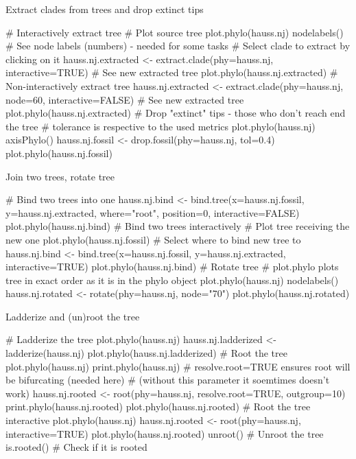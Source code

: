 \documentclass[compress, ucs, xelatex, 11pt, xcolor=svgnames,
  hyperref={
    bookmarks=true,
    unicode=true,
    colorlinks=true,
    pdftitle={Molecular data in R},
    plainpages=false,
    pdfauthor={Vojtech Zeisek},
    pdfsubject={Course about phylogeny and evolution in R},
    pdfcreator={XeLaTeX},
    pdfkeywords={R, evolution, phylogeny, molecular data},
    linkcolor=Tomato,
    anchorcolor=SaddleBrown,
    citecolor=Goldenrod,
    filecolor=DarkMagenta,
    menucolor=Sienna,
    urlcolor=DarkTurquoise,
    pdftex},
  url={hyphens, lowtilde} %
  ]{beamer}
\begin{document}
\begin{frame}[fragile]{Extract clades from trees and drop extinct tips}
  \begin{spluscode}
    # Interactively extract tree
    # Plot source tree
    plot.phylo(hauss.nj)
    nodelabels() # See node labels (numbers) - needed for some tasks
    # Select clade to extract by clicking on it
    hauss.nj.extracted <- extract.clade(phy=hauss.nj, interactive=TRUE)
    # See new extracted tree
    plot.phylo(hauss.nj.extracted)
    # Non-interactively extract tree
    hauss.nj.extracted <- extract.clade(phy=hauss.nj, node=60,
      interactive=FALSE)
    # See new extracted tree
    plot.phylo(hauss.nj.extracted)
    # Drop "extinct" tips - those who don't reach end the tree
    # tolerance is respective to the used metrics
    plot.phylo(hauss.nj)
    axisPhylo()
    hauss.nj.fossil <- drop.fossil(phy=hauss.nj, tol=0.4)
    plot.phylo(hauss.nj.fossil)
  \end{spluscode}
\end{frame}

\begin{frame}[fragile]{Join two trees, rotate tree}
  \begin{spluscode}
    # Bind two trees into one
    hauss.nj.bind <- bind.tree(x=hauss.nj.fossil, y=hauss.nj.extracted,
      where="root", position=0, interactive=FALSE)
    plot.phylo(hauss.nj.bind)
    # Bind two trees interactively
    # Plot tree receiving the new one
    plot.phylo(hauss.nj.fossil)
    # Select where to bind new tree to
    hauss.nj.bind <- bind.tree(x=hauss.nj.fossil, y=hauss.nj.extracted,
      interactive=TRUE)
    plot.phylo(hauss.nj.bind)
    # Rotate tree
    # plot.phylo plots tree in exact order as it is in the phylo object
    plot.phylo(hauss.nj)
    nodelabels()
    hauss.nj.rotated <- rotate(phy=hauss.nj, node="70")
    plot.phylo(hauss.nj.rotated)
  \end{spluscode}
\end{frame}

\begin{frame}[fragile]{Ladderize and (un)root the tree}
  \begin{spluscode}
    # Ladderize the tree
    plot.phylo(hauss.nj)
    hauss.nj.ladderized <- ladderize(hauss.nj)
    plot.phylo(hauss.nj.ladderized)
    # Root the tree
    plot.phylo(hauss.nj)
    print.phylo(hauss.nj)
    # resolve.root=TRUE ensures root will be bifurcating (needed here)
    # (without this parameter it soemtimes doesn't work)
    hauss.nj.rooted <- root(phy=hauss.nj, resolve.root=TRUE, outgroup=10)
    print.phylo(hauss.nj.rooted)
    plot.phylo(hauss.nj.rooted)
    # Root the tree interactive
    plot.phylo(hauss.nj)
    hauss.nj.rooted <- root(phy=hauss.nj, interactive=TRUE)
    plot.phylo(hauss.nj.rooted)
    unroot() # Unroot the tree
    is.rooted() # Check if it is rooted
  \end{spluscode}
\end{frame}
\end{document}
